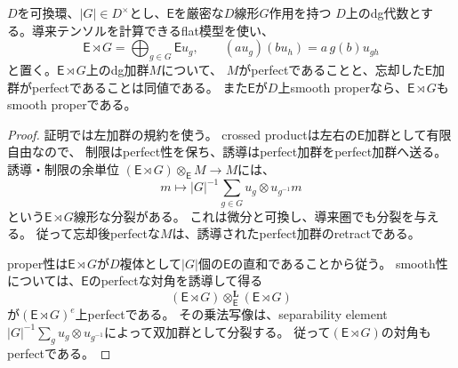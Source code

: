 \begin{lemma}\label{med:lem:crossed-perfect}
$D$を可換環、$|G|\in D^\times$とし、$\mathsf E$を厳密な$D$線形$G$作用を持つ
$D$上のdg代数とする。導来テンソルを計算できるflat模型を使い、
\[
 \mathsf E\rtimes G=\bigoplus_{g\in G}\mathsf E u_g,
 \qquad (a u_g)(b u_h)=a\,g(b)u_{gh}
\]
と置く。$\mathsf E\rtimes G$上のdg加群$M$について、
$M$がperfectであることと、忘却した$\mathsf E$加群がperfectであることは同値である。
また$\mathsf E$が$D$上smooth properなら、$\mathsf E\rtimes G$もsmooth properである。
\end{lemma}
\begin{proof}
証明では左加群の規約を使う。
crossed productは左右の$\mathsf E$加群として有限自由なので、
制限はperfect性を保ち、誘導はperfect加群をperfect加群へ送る。
誘導・制限の余単位
$(\mathsf E\rtimes G)\otimes_{\mathsf E}M\to M$には、
\[
 m\longmapsto |G|^{-1}\sum_{g\in G}u_g\otimes u_{g^{-1}}m
\]
という$\mathsf E\rtimes G$線形な分裂がある。
これは微分と可換し、導来圏でも分裂を与える。
従って忘却後perfectな$M$は、誘導されたperfect加群のretractである。

proper性は$\mathsf E\rtimes G$が$D$複体として$|G|$個の$\mathsf E$の直和であることから従う。
smooth性については、$\mathsf E$のperfectな対角を誘導して得る
\[
 (\mathsf E\rtimes G)\otimes_{\mathsf E}^{\mathbf L}(\mathsf E\rtimes G)
\]
が$(\mathsf E\rtimes G)^e$上perfectである。
その乗法写像は、separability element
$|G|^{-1}\sum_g u_g\otimes u_{g^{-1}}$によって双加群として分裂する。
従って$(\mathsf E\rtimes G)$の対角もperfectである。
\end{proof}

